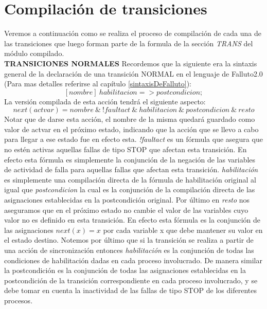 \documentclass[titlepage, 12pt]{book}
\begin{document}
\section{Compilaci\'on de transiciones}
Veremos a continuaci\'on como se realiza el proceso de compilaci\'on de cada una de las transiciones que luego forman parte de la formula de la secci\'on \textit{TRANS} del m\'odulo compilado.\\

\textbf{TRANSICIONES NORMALES}
Recordemos que la siguiente era la sintaxis general de la declaraci\'on de una transici\'on NORMAL en el lenguaje de Falluto2.0 (Para mas detalles referirse al cap\'itulo \ref{sintaxisDeFalluto}):
$$[nombre]~habilitacion => postcondicion;$$
La versi\'on compilada de esta acci\'on tendr\'a el siguiente aspecto:
$$next(actvar)=nombre~\&~!faultact~\&~habilitacion~\&~postcondicion~\&~resto$$
Notar que de darse esta acci\'on, el nombre de la misma quedar\'a guardado como valor de actvar en el pr\'oximo estado, indicando que la acci\'on que se llevo a cabo para llegar a ese estado fue en efecto esta. \textit{!faultact} es un f\'ormula que asegura que no est\'en activas aquellas fallas de tipo STOP que afectan esta transici\'on. En efecto esta f\'ormula es simplemente la conjunci\'on de la negaci\'on de las variables de actividad de falla para aquellas fallas que afectan esta transici\'on. \textit{habilitaci\'on} es simplemente una compilaci\'on directa de la f\'ormula de habilitaci\'on original al igual que \textit{postcondicion} la cual es la conjunci\'on de la compilaci\'on directa de las asignaciones establecidas en la postcondici\'on original. Por \'ultimo en \textit{resto} nos aseguramos que en el pr\'oximo estado no cambie el valor de las variables cuyo valor no es definido en esta transici\'on. En efecto esta f\'ormula es la conjunci\'on de las asignaciones $next(x)=x$ por cada variable x que debe mantener su valor en el estado destino. Notemos por \'ultimo que si la transici\'on se realiza a partir de una acci\'on de sincronizaci\'on entonces \textit{habilitaci\'on} es la conjunci\'on de todas las condiciones de habilitaci\'on dadas en cada proceso involucrado. De manera similar la postcondici\'on es la conjunci\'on de todas las asignaciones establecidas en la postcondici\'on de la transici\'on correspondiente en cada proceso involucrado, y se debe tomar en cuenta la inactividad de las fallas de tipo STOP de los diferentes procesos.\\
\end{document}

